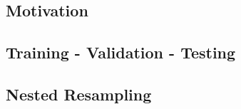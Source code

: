 

\subsection{Motivation}


\subsection{Training - Validation - Testing}


\subsection{Nested Resampling}


